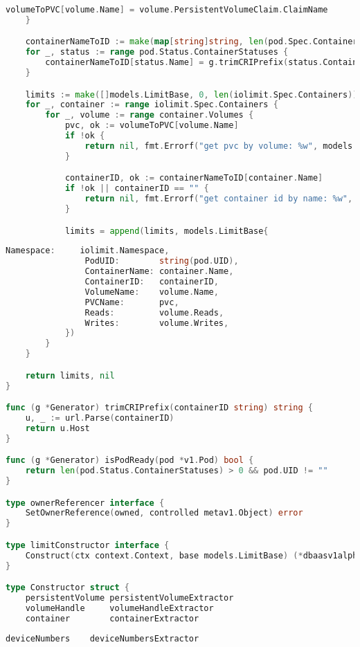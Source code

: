\begin{appendices}
\begin{lstlisting}[language=Go,label=lst:podiolimit_gen3, caption={Генерация PodIOLimit (продолжение листинга~\ref{lst:podiolimit_gen2})}]
		volumeToPVC[volume.Name] = volume.PersistentVolumeClaim.ClaimName
	}

	containerNameToID := make(map[string]string, len(pod.Spec.Containers))
	for _, status := range pod.Status.ContainerStatuses {
		containerNameToID[status.Name] = g.trimCRIPrefix(status.ContainerID)
	}

	limits := make([]models.LimitBase, 0, len(iolimit.Spec.Containers))
	for _, container := range iolimit.Spec.Containers {
		for _, volume := range container.Volumes {
			pvc, ok := volumeToPVC[volume.Name]
			if !ok {
				return nil, fmt.Errorf("get pvc by volume: %w", models.ErrPVCNotFound)
			}

			containerID, ok := containerNameToID[container.Name]
			if !ok || containerID == "" {
				return nil, fmt.Errorf("get container id by name: %w", models.ErrContainerNotFound)
			}

			limits = append(limits, models.LimitBase{
\end{lstlisting}

\begin{lstlisting}[language=Go,label=lst:podiolimit_gen4, caption={Генерация PodIOLimit (продолжение листинга~\ref{lst:podiolimit_gen3})}]
				Namespace:     iolimit.Namespace,
				PodUID:        string(pod.UID),
				ContainerName: container.Name,
				ContainerID:   containerID,
				VolumeName:    volume.Name,
				PVCName:       pvc,
				Reads:         volume.Reads,
				Writes:        volume.Writes,
			})
		}
	}

	return limits, nil
}

func (g *Generator) trimCRIPrefix(containerID string) string {
	u, _ := url.Parse(containerID)
	return u.Host
}

func (g *Generator) isPodReady(pod *v1.Pod) bool {
	return len(pod.Status.ContainerStatuses) > 0 && pod.UID != ""
}

type ownerReferencer interface {
	SetOwnerReference(owned, controlled metav1.Object) error
}

type limitConstructor interface {
	Construct(ctx context.Context, base models.LimitBase) (*dbaasv1alpha1.Limit, error)
}

type Constructor struct {
	persistentVolume persistentVolumeExtractor
	volumeHandle     volumeHandleExtractor
	container        containerExtractor
\end{lstlisting}

\begin{lstlisting}[language=Go,label=lst:podiolimit_gen5, caption={Генерация PodIOLimit (продолжение листинга~\ref{lst:podiolimit_gen4})}]
	deviceNumbers    deviceNumbersExtractor


\end{lstlisting}
\end{appendices}
